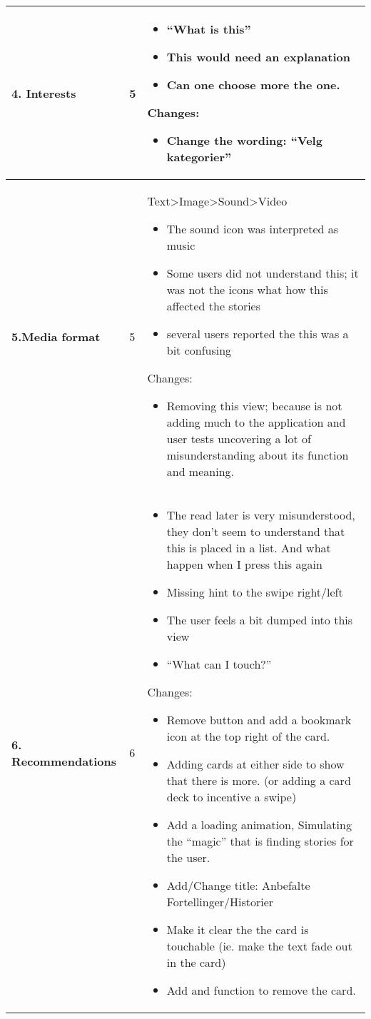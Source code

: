 \begin{center}
\begin{longtable}{ | p{4cm} | p{3cm} | p{9cm}|}
		\textbf{4. Interests} & 5  & 
		\begin{itemize}		
			\item “What is this”
			\item This would need an explanation 
			\item Can one choose more the one.
		\end{itemize}			
		Changes:
		\begin{itemize}
			\item Change the wording: “Velg kategorier”
		\end{itemize}\\\hline
		\textbf{5.Media format} & 5 & 
		Text>Image>Sound>Video
		\begin{itemize}
			\item The sound icon was interpreted as music
			\item Some users did not understand this; it was not the icons what how this affected the stories
			\item several users reported the this was a bit confusing 
		\end{itemize}
		Changes:
		\begin{itemize}
			\item Removing this view; because is not adding much to the application and user tests uncovering a lot of misunderstanding about its function and meaning.
		\end{itemize}
		\\\hline
		
		\textbf{6. Recommendations} & 6 & 
		\begin{itemize}
			
			\item The read later is very misunderstood, they don’t seem to understand that this is placed in a list. And what happen when I press this again
			\item Missing hint to the swipe right/left
			\item The user feels a bit dumped into this view
			\item “What can I touch?”
		\end{itemize}
		Changes:
		\begin{itemize}
			\item Remove button and add a bookmark icon at the top right of the card. 
			\item Adding cards at either side to show that there is more. (or adding a card deck to incentive a swipe)
			\item Add a loading animation, Simulating the “magic” that is finding stories for the user.
			\item Add/Change title: Anbefalte Fortellinger/Historier
			\item Make it clear the the card is touchable (ie. make the text fade out in the card)
			\item Add and function to remove the card.
		\end{itemize}
		\\\hline
		

\end{longtable}
\end{center}
